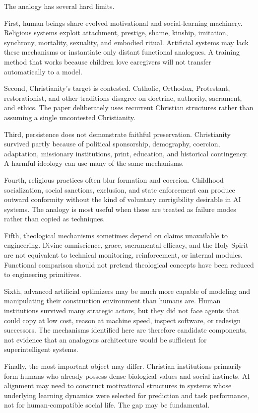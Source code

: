 \documentclass[11pt]{article}
\begin{document}
The analogy has several hard limits.

First, human beings share evolved motivational and social-learning machinery. Religious systems exploit attachment, prestige, shame, kinship, imitation, synchrony, mortality, sexuality, and embodied ritual. Artificial systems may lack these mechanisms or instantiate only distant functional analogues. A training method that works because children love caregivers will not transfer automatically to a model.

Second, Christianity's target is contested. Catholic, Orthodox, Protestant, restorationist, and other traditions disagree on doctrine, authority, sacrament, and ethics. The paper deliberately uses recurrent Christian structures rather than assuming a single uncontested Christianity.

Third, persistence does not demonstrate faithful preservation. Christianity survived partly because of political sponsorship, demography, coercion, adaptation, missionary institutions, print, education, and historical contingency. A harmful ideology can use many of the same mechanisms.

Fourth, religious practices often blur formation and coercion. Childhood socialization, social sanctions, exclusion, and state enforcement can produce outward conformity without the kind of voluntary corrigibility desirable in AI systems. The analogy is most useful when these are treated as failure modes rather than copied as techniques.

Fifth, theological mechanisms sometimes depend on claims unavailable to engineering. Divine omniscience, grace, sacramental efficacy, and the Holy Spirit are not equivalent to technical monitoring, reinforcement, or internal modules. Functional comparison should not pretend theological concepts have been reduced to engineering primitives.

Sixth, advanced artificial optimizers may be much more capable of modeling and manipulating their construction environment than humans are. Human institutions survived many strategic actors, but they did not face agents that could copy at low cost, reason at machine speed, inspect software, or redesign successors. The mechanisms identified here are therefore candidate components, not evidence that an analogous architecture would be sufficient for superintelligent systems.

Finally, the most important object may differ. Christian institutions primarily form humans who already possess dense biological values and social instincts. AI alignment may need to construct motivational structures in systems whose underlying learning dynamics were selected for prediction and task performance, not for human-compatible social life. The gap may be fundamental.
\end{document}
